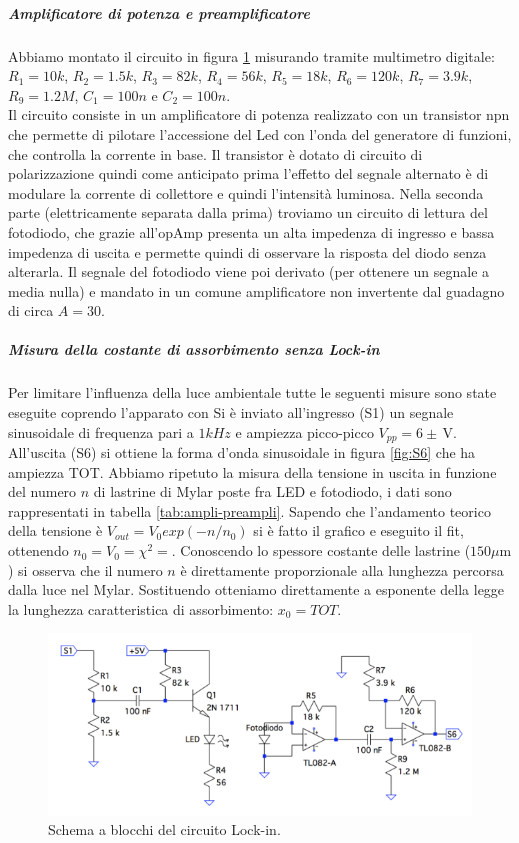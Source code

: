 \documentclass[10pt,a4paper]{article}
\begin{document}
\subparagraph{Amplificatore di potenza e preamplificatore}
Abbiamo montato il circuito in figura \ref{fig:ampli-preampli} misurando tramite multimetro digitale: $R_1=10k$, $R_2=1.5k$, $R_3=82k$, $R_4=56k$, $R_5=18k$, $R_6=120k$, $R_7=3.9k$, $R_9=1.2M$, $C_1=100n$ e $C_2=100n$.\\
%
Il circuito consiste in un amplificatore di potenza realizzato con un transistor npn che permette di pilotare l'accessione del Led con l'onda del generatore di funzioni, che controlla la corrente in base.
Il transistor è dotato di circuito di polarizzazione quindi come anticipato prima l'effetto del segnale alternato è di modulare la corrente di collettore e quindi l'intensità luminosa.
Nella seconda parte (elettricamente separata dalla prima) troviamo un  circuito di lettura del fotodiodo, che grazie all'opAmp presenta un alta impedenza di ingresso e bassa impedenza di uscita e permette quindi di osservare la risposta del diodo senza alterarla.
Il segnale del fotodiodo viene poi derivato (per ottenere un segnale a media nulla) e mandato in un comune amplificatore non invertente dal guadagno di circa $A = 30$.\\

\subparagraph{Misura della costante di assorbimento senza Lock-in}
Per limitare l'influenza della luce ambientale tutte le seguenti misure sono state eseguite coprendo l'apparato con %
Si è inviato all'ingresso (S1) un segnale sinusoidale di frequenza pari a $1 kHz$ e ampiezza picco-picco $V_{pp}= 6 \pm \,\mbox{V}$. All'uscita (S6) si ottiene la forma d'onda sinusoidale in figura \ref{fig:S6} che ha ampiezza TOT. Abbiamo ripetuto la misura della tensione in uscita in funzione del numero $n$ di lastrine di Mylar poste fra LED e fotodiodo, i dati sono rappresentati in tabella \ref{tab:ampli-preampli}. Sapendo che l'andamento teorico della tensione è $V_{out}=V_0exp(-n/n_0)$ si è fatto il grafico e eseguito il fit, ottenendo $n_0= V_0= \chi^2=$. Conoscendo lo spessore costante delle lastrine ($150\mu \mbox{m}$) si osserva che il numero $n$ è direttamente proporzionale alla lunghezza percorsa dalla luce nel Mylar. Sostituendo otteniamo direttamente a esponente della legge la lunghezza caratteristica di assorbimento: $x_0= TOT$.

\begin{figure}[!htb]
  \centering
  \includegraphics[scale=0.75]{ampli-preampli.png}
\caption{Schema a blocchi del circuito Lock-in.\label{fig:ampli-preampli}}
\end{figure}
\end{document}
